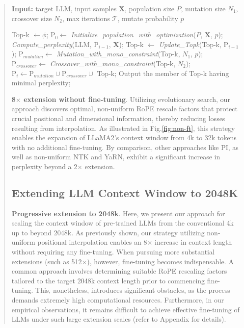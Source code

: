 \begin{abstract}
\begin{algorithm}[t]
	\small
	\caption{The search algorithm}
	\textbf{Input:} target LLM, input samples $\mathbf{X}$,   population size $P$, mutation size $N_1$, crossover size $N_2$, max iterations $\mathcal{T}$, mutate probability $p$\\

	\begin{algorithmic}[1]
		\label{alg:search}
		\STATE Top-k $\gets \phi$;
		\STATE $\text{P}_0 \gets$ \textit{Initialize\_population\_with\_optimization}($P$, $\mathbf{X}$, $p$);
		\STATE \textit{Compute\_perplexity}(LLM, $\text{P}_{i-1}$, $\mathbf{X}$);
		\STATE Top-k $\gets$ \textit{Update\_Topk}(Top-k, $\text{P}_{i-1}$);
		\STATE $\text{P}_{mutation} \gets$ \textit{Mutation\_with\_mono\_constraint}(Top-k, $N_1$, $p$);
		\STATE $\text{P}_{crossover} \gets$ \textit{Crossover\_with\_mono\_constraint}(Top-k, $N_2$);
		\STATE $\text{P}_i \gets \text{P}_{mutation} \cup \text{P}_{crossover} \cup$ Top-k;
		\ENDFOR
		\STATE Output the member of Top-k having minimal perplexity;
	\end{algorithmic}
\end{algorithm}

\textbf{8$\times$ extension without fine-tuning}. Utilizing evolutionary search, our approach discovers optimal, non-uniform RoPE rescale factors that protect crucial positional and dimensional information, thereby reducing losses resulting from interpolation. As illustrated in Fig.\ref{fig:non-ft}, this strategy enables the expansion of LLaMA2’s context window from 4k to 32k tokens with no additional fine-tuning. By comparison, other approaches like PI, as well as non-uniform NTK and YaRN, exhibit a significant increase in perplexity beyond a 2$\times$ extension.

\subsection{Extending LLM Context Window to 2048K}
\label{sec:extendto2048k}

\textbf{Progressive extension to 2048k}. Here, we present our approach for scaling the context window of pre-trained LLMs from the conventional 4k up to beyond 2048k. As previously shown, our strategy utilizing non-uniform positional interpolation enables an 8$\times$ increase in context length without requiring any fine-tuning. When pursuing more substantial extensions (such as 512$\times$), however, fine-tuning becomes indispensable. A common approach involves determining suitable RoPE rescaling factors tailored to the target 2048k context length prior to commencing fine-tuning. This, nonetheless, introduces significant obstacles, as the process demands extremely high computational resources. Furthermore, in our empirical observations, it remains difficult to achieve effective fine-tuning of LLMs under such large extension scales (refer to Appendix for details).


\end{abstract}

